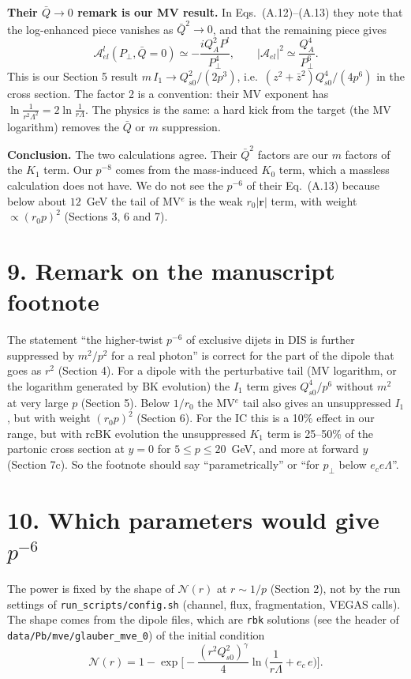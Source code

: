 \documentclass[12pt]{article}
\newcommand{\pt}{p_\perp}
\begin{document}
\textbf{Their $\bar Q\to0$ remark is our MV result.} In Eqs.~(A.12)--(A.13) they note that the
log-enhanced piece vanishes as $\bar Q^2\to0$, and that the remaining piece gives
\[
  \mathcal A^l_{el}(P_\perp,\bar Q=0)\simeq-\frac{iQ_A^2P^l}{P_\perp^4},\qquad
  |\mathcal A_{el}|^2\simeq\frac{Q_A^4}{P_\perp^6}.
\]
This is our Section 5 result $m\,I_1\to Q_{s0}^2/(2p^3)$, i.e.\ $(z^2+\bar z^2)Q_{s0}^4/(4p^6)$ in the cross
section. The factor 2 is a convention: their MV exponent has $\ln\frac{1}{r^2\Lambda^2}=2\ln\frac1{r\Lambda}$.
The physics is the same: a hard kick from the target (the MV logarithm) removes the $\bar Q$ or $m$
suppression.

\textbf{Conclusion.} The two calculations agree. Their $\bar Q^2$ factors are our $m$ factors of the $K_1$
term. Our $p^{-8}$ comes from the mass-induced $K_0$ term, which a massless calculation does not have.
We do not see the $p^{-6}$ of their Eq.~(A.13) because below about $12$~GeV the tail of MV$^e$ is the
weak $r_0|\mathbf r|$ term, with weight $\propto(r_0p)^2$ (Sections 3, 6 and 7).

\section*{9. Remark on the manuscript footnote}

The statement ``the higher-twist $p^{-6}$ of exclusive dijets in DIS is further suppressed by
$m^2/p^2$ for a real photon'' is correct for the part of the dipole that goes as $r^2$ (Section 4).
For a dipole with the perturbative tail (MV logarithm, or the logarithm generated by BK evolution) the $I_1$ term
gives $Q_{s0}^4/p^6$ without $m^2$ at very large $p$ (Section 5). Below $1/r_0$ the MV$^e$ tail also
gives an unsuppressed $I_1$, but with weight $(r_0p)^2$ (Section 6). For the IC this is a 10\%
effect in our range, but with rcBK evolution the unsuppressed $K_1$ term is 25--50\% of the partonic cross
section at $y=0$ for $5\le p\le20$~GeV, and more at forward $y$ (Section 7c). So the footnote should say ``parametrically'' or ``for $\pt$ below
$e_ce\Lambda$''.

\section*{10. Which parameters would give $p^{-6}$}

The power is fixed by the shape of $\mathcal N(r)$ at $r\sim1/p$ (Section 2), not by the run settings
of \texttt{run\_scripts/config.sh} (channel, flux, fragmentation, VEGAS calls). The shape comes from the
dipole files, which are \texttt{rbk} solutions (see the header of \texttt{data/Pb/mve/glauber\_mve\_0})
of the initial condition
\[
  \mathcal N(r)=1-\exp\Big[-\frac{(r^2Q_{s0}^2)^{\gamma}}{4}\ln\Big(\frac{1}{r\Lambda}+e_c\,e\Big)\Big].
\]
\end{document}
